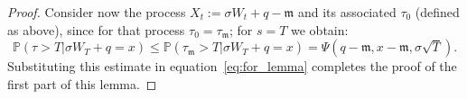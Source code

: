 \documentclass[12pt]{article}
\theoremstyle{definition}
\begin{document}
\begin{proof}

Consider now the process $X_t:=\sigma W_t+q-\mathfrak{m}$ and its associated $\tau_0$ (defined as above), since for that process $\tau_0=\tau_{\mathfrak{m}}$; for $s=T$ we obtain:
$$
\mathbb{P}(\tau > T\vert \sigma W_T+q=x) \le\mathbb{P}(\tau_\mathfrak{m} > T\vert \sigma W_T+q=x)=\Psi\!\left(q-\mathfrak{m},x-\mathfrak{m},\sigma\sqrt{T}\right).
$$
Substituting this estimate in equation~\eqref{eq:for_lemma} completes the proof of the first part of this lemma.

\end{proof}
\end{document}
